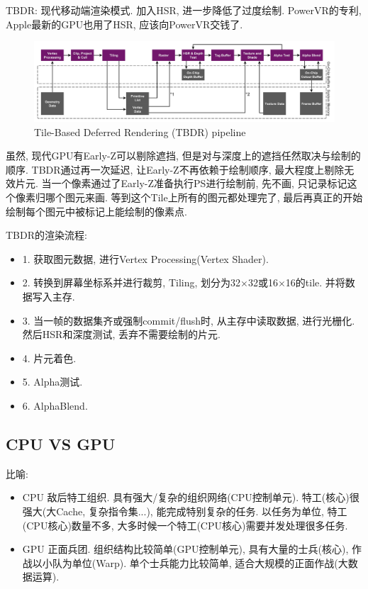\documentclass[UTF8]{ctexart}
\begin{document}
TBDR: 现代移动端渲染模式. 加入HSR, 进一步降低了过度绘制. PowerVR的专利, Apple最新的GPU也用了HSR, 应该向PowerVR交钱了.

\begin{figure}[H]
  \includegraphics[width=15cm]{tbdr.png}
  \centering
  \caption{Tile-Based Deferred Rendering (TBDR) pipeline\cite{powerVR_int}}
  \label{fig:tbdr}
\end{figure}

虽然, 现代GPU有Early-Z可以剔除遮挡, 但是对与深度上的遮挡任然取决与绘制的顺序. TBDR通过再一次延迟, 让Early-Z不再依赖于绘制顺序, 最大程度上剔除无效片元. 当一个像素通过了Early-Z准备执行PS进行绘制前, 先不画, 只记录标记这个像素归哪个图元来画. 等到这个Tile上所有的图元都处理完了, 最后再真正的开始绘制每个图元中被标记上能绘制的像素点.

TBDR的渲染流程:
\begin{itemize}
\item 1. 获取图元数据, 进行Vertex Processing(Vertex Shader).
\item 2. 转换到屏幕坐标系并进行裁剪, Tiling, 划分为32$\times$32或16$\times$16的tile. 并将数据写入主存.
\item 3. 当一帧的数据集齐或强制commit/flush时, 从主存中读取数据, 进行光栅化. 然后HSR和深度测试, 丢弃不需要绘制的片元.
\item 4. 片元着色.
\item 5. Alpha测试.
\item 6. AlphaBlend.
\end{itemize}

\subsection{CPU VS GPU}
比喻:
\begin{itemize}
\item CPU 敌后特工组织. 具有强大/复杂的组织网络(CPU控制单元).  特工(核心)很强大(大Cache, 复杂指令集...), 能完成特别复杂的任务. 以任务为单位, 特工(CPU核心)数量不多, 大多时候一个特工(CPU核心)需要并发处理很多任务.
\item GPU 正面兵团. 组织结构比较简单(GPU控制单元), 具有大量的士兵(核心), 作战以小队为单位(Warp). 单个士兵能力比较简单, 适合大规模的正面作战(大数据运算).
\end{itemize}
\end{document}
